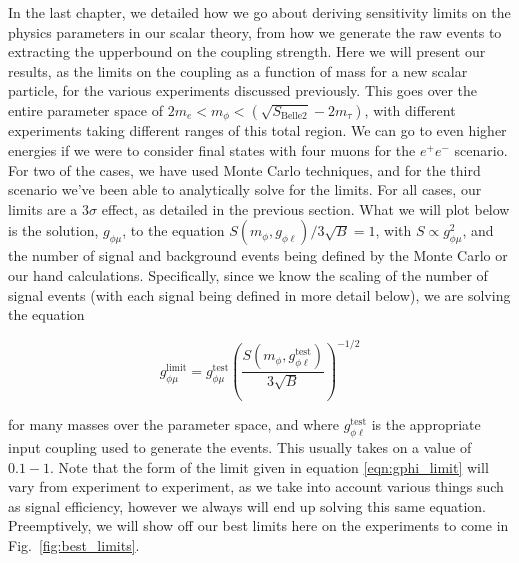 \label{chapter:results}

In the last chapter, we detailed how we go about deriving sensitivity limits on the physics parameters in our scalar theory, from how we generate the raw events to extracting the upperbound on the coupling strength.
Here we will present our results, as the limits on the coupling as a function of mass for a new scalar particle, for the various experiments discussed previously.
This goes over the entire parameter space of $2m_e < m_\phi < (\sqrt{S_\textrm{Belle2}} - 2m_\tau)$, with different experiments taking different ranges of this total region.
We can go to even higher energies if we were to consider final states with four muons for the $e^+ e^-$ scenario.
For two of the cases, we have used \madgraph Monte Carlo techniques, and for the third scenario we've been able to analytically solve for the limits.
For all cases, our limits are a $3\sigma$ effect, as detailed in the previous section.
What we will plot below is the solution, $g_{\phi\mu}$, to the equation $S(m_\phi,g_{\phi\ell})/3\sqrt{B} = 1$, with $S \propto g_{\phi\mu}^2$, and the number of signal and background events being defined by the Monte Carlo or our hand calculations.
Specifically, since we know the scaling of the number of signal events (with each signal being defined in more detail below), we are solving the equation

\begin{equation}
\label{eqn:gphi_limit}
g_{\phi\mu}^\textrm{limit} = g_{\phi\mu}^\textrm{test} \left( \frac{S(m_\phi,g_{\phi\ell}^\textrm{test})}{3\sqrt{B}} \right)^{-1/2}
\end{equation}

\noindent for many masses over the parameter space, and where $g_{\phi\ell}^\textrm{test}$ is the appropriate input coupling used to generate the events.
This usually takes on a value of $0.1 - 1$.
Note that the form of the limit given in equation \ref{eqn:gphi_limit} will vary from experiment to experiment, as we take into account various things such as signal efficiency, however we always will end up solving this same equation.
Preemptively, we will show off our best limits here on the experiments to come in Fig.~\ref{fig:best_limits}.

